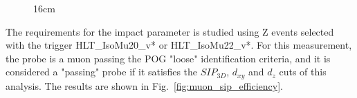 \begin{figure}[hbtp]{16cm}
	\quad
	\label{fig:muon_reco_id_efficiency}
\end{figure}

The requirements for the impact parameter is studied using Z events selected with the trigger HLT\_IsoMu20\_v* or HLT\_IsoMu22\_v*. For this measurement, the probe is a muon passing the POG "loose" identification criteria, and it is considered a "passing" probe if it satisfies the $SIP_{3D}$, $d_{xy}$ and $d_{z}$ cuts of this analysis. The results are shown in Fig.~\ref{fig:muon_sip_efficiency}.

